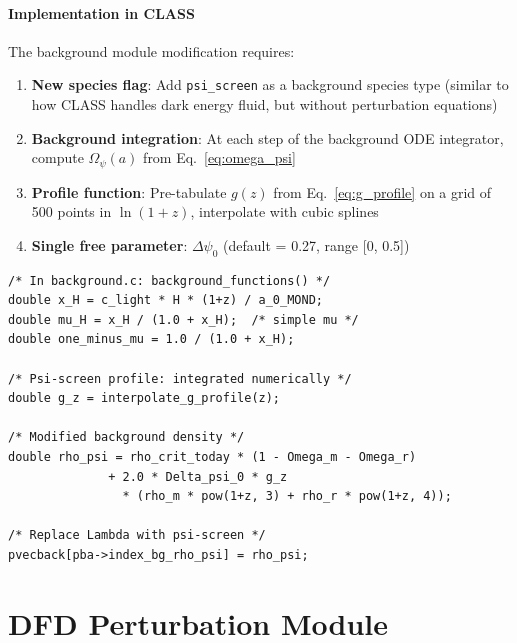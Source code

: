 \documentclass[11pt,a4paper]{article}
\begin{document}
\subsection{Implementation in CLASS}

The background module modification requires:

\begin{enumerate}
\item \textbf{New species flag}: Add \texttt{psi\_screen} as a
  background species type (similar to how CLASS handles dark energy
  fluid, but without perturbation equations)
\item \textbf{Background integration}: At each step of the background
  ODE integrator, compute $\Omega_\psi(a)$ from
  Eq.~\eqref{eq:omega_psi}
\item \textbf{Profile function}: Pre-tabulate $g(z)$ from
  Eq.~\eqref{eq:g_profile} on a grid of 500 points in $\ln(1+z)$,
  interpolate with cubic splines
\item \textbf{Single free parameter}: $\Delta\psi_0$ (default = 0.27,
  range [0, 0.5])
\end{enumerate}

\begin{lstlisting}[caption={Pseudo-code for DFD background module},
  label=lst:background]
/* In background.c: background_functions() */
double x_H = c_light * H * (1+z) / a_0_MOND;
double mu_H = x_H / (1.0 + x_H);  /* simple mu */
double one_minus_mu = 1.0 / (1.0 + x_H);

/* Psi-screen profile: integrated numerically */
double g_z = interpolate_g_profile(z);

/* Modified background density */
double rho_psi = rho_crit_today * (1 - Omega_m - Omega_r)
              + 2.0 * Delta_psi_0 * g_z
                * (rho_m * pow(1+z, 3) + rho_r * pow(1+z, 4));

/* Replace Lambda with psi-screen */
pvecback[pba->index_bg_rho_psi] = rho_psi;
\end{lstlisting}


\part{DFD Perturbation Module}
\label{part:perturbations}

\end{document}
